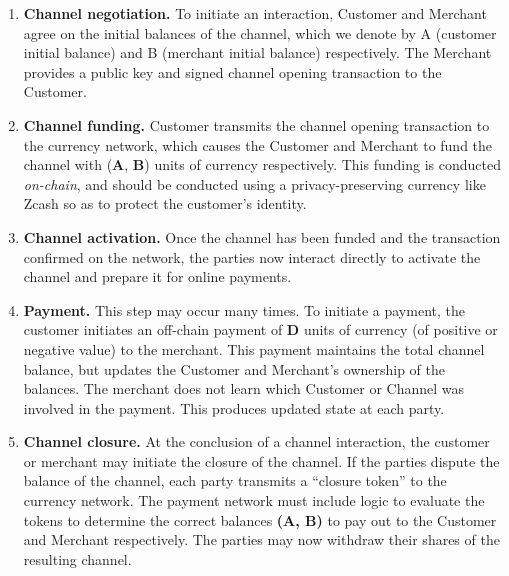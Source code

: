 \documentclass[11pt]{report}
\begin{document}
\begin{enumerate}
\item {\bf Channel negotiation.} To initiate an interaction, Customer and Merchant agree on the initial balances of the channel, which we denote by A (customer initial balance) and B (merchant initial balance) respectively. The Merchant provides a public key and signed channel opening transaction to the Customer. 


\item {\bf Channel funding.} Customer transmits the channel opening transaction to the currency network, which causes the Customer and Merchant to fund the channel with ({\bf A}, {\bf B}) units of currency respectively. This funding is conducted {\em on-chain}, and should be conducted using a privacy-preserving currency like Zcash so as to protect the customer's identity.

\item {\bf Channel activation.} Once the channel has been funded and the transaction confirmed on the network, the parties now interact directly to activate the channel and prepare it for online payments. 

\item {\bf Payment.} This step may occur many times. To initiate a payment, the customer initiates an off-chain payment of {\bf D} units of currency (of positive or negative value) to the merchant. This payment maintains the total channel balance, but updates the Customer and Merchant's ownership of the balances. The merchant does not learn which Customer or Channel was involved in the payment. This produces updated state at each party.

\item {\bf Channel closure.} At the conclusion of a channel interaction, the customer or merchant may initiate the closure of the channel. If the parties dispute the balance of the channel, each party transmits a ``closure token'' to the currency network. The payment network must include logic to evaluate the tokens to determine the correct balances {\bf (A,  B)} to pay out to the Customer and Merchant respectively. The parties may now withdraw their shares of the resulting channel.

\end{enumerate}
\end{document}
